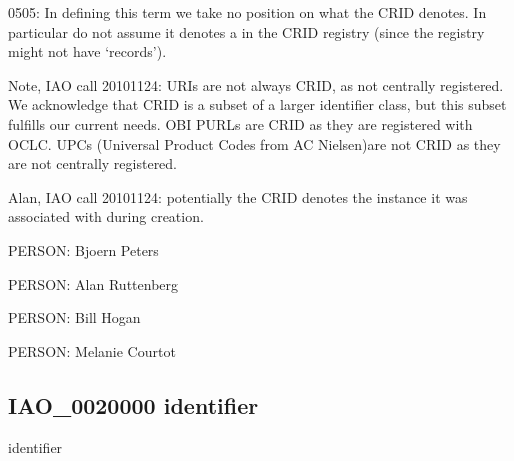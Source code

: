 \documentclass[letterpaper,10pt,english]{sphinxmanual}
\begin{document}
\begin{sphinxShadowBox}

\sphinxhyphen{}05\sphinxhyphen{}05: In defining this term we take no position on what the CRID denotes. In particular do not assume it denotes a  in the CRID registry (since the registry might not have ‘records’).

\sphinxAtStartPar
Note, IAO call 20101124: URIs are not always CRID, as not centrally registered. We acknowledge that CRID is a subset of a larger identifier class, but this subset fulfills our current needs. OBI PURLs are CRID as they are registered with OCLC. UPCs (Universal Product Codes from AC Nielsen)are not CRID as they are not centrally registered.

\sphinxAtStartPar
Alan, IAO call 20101124: potentially the CRID denotes the instance it was associated with during creation.
\end{sphinxShadowBox}

\begin{sphinxShadowBox}

\sphinxAtStartPar
{}
\end{sphinxShadowBox}

\begin{sphinxShadowBox}

\sphinxAtStartPar
PERSON: Bjoern Peters

\sphinxAtStartPar
PERSON: Alan Ruttenberg

\sphinxAtStartPar
PERSON: Bill Hogan

\sphinxAtStartPar
PERSON: Melanie Courtot
\end{sphinxShadowBox}
\begin{quote}

\ignorespaces \end{quote}


\subsection{IAO\_0020000 \sphinxhyphen{} identifier}
\label{\detokenize{doc-IAO_0020000:iao-0020000-identifier}}\label{\detokenize{doc-IAO_0020000:index-0}}\label{\detokenize{doc-IAO_0020000::doc}}
\begin{sphinxShadowBox}

\sphinxAtStartPar
identifier
\end{sphinxShadowBox}
\end{document}
